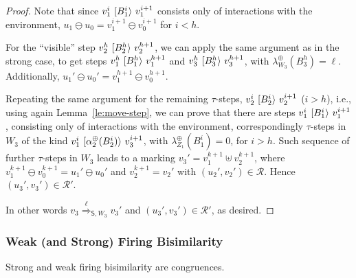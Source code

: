 \documentclass{LMCS}
\newcommand{\mjoin}{\ensuremath{\uplus}}
\newcommand{\monSub}[2]{\ensuremath{{#1}_{#2}^\oplus}}
\newcommand{\trans}[1]{\ensuremath{\ [\/{#1}\/\rangle}\ }
\newcommand{\Ltr}[3][x]{\ensuremath{\stackrel{{#3}}{\Longrightarrow}_{\mathsf{#1},#2}}}
\begin{document}
\begin{proof}
  Note that since $v_1^i \trans{B_1^{i}} v_1^{i+1}$ consists only of
  interactions with the environment, $u_1 \ominus u_0 = v_1^{i+1}
  \ominus v_0^{i+1}$ for $i<h$.

For the ``visible'' step $v_2^h \trans{B_2^h} v_2^{h+1}$, we can apply
the same argument as in the strong case, to get steps $v_1^h
\trans{B_1^{h}} v_1^{h+1}$ and $v_3^h \trans{B_3^{h}} v_3^{h+1}$, with
$\monSub{\lambda}{{W_3}}(B_3^h) = \ell$.  Additionally, $u_1' \ominus u_0' =
v_1^{h+1} \ominus v_0^{h+1}$.

Repeating the same argument for the remaining $\tau$-steps, $v_2^i
\trans{B_2^i} v_2^{i+1}$ ($i > h$), i.e., using again
Lemma~\ref{le:move-step}, we can prove that there are steps $v_1^i
\trans{B_1^{i}} v_1^{i+1}$, consisting only of interactions with the
environment, correspondingly $\tau$-steps in $W_3$ of the kind $v_1^i
\trans{\monSub{\alpha}{2}(B_2^{i})} v_3^{i+1}$, with
$\monSub{\lambda}{{Z_1}}(B_1^i) = 0$, for $i>h$.
Such sequence of further $\tau$-steps in $W_3$ leads to a marking
$v_3' = v_1^{k+1} \mjoin v_2^{k+1}$, where $v_1^{k+1} \ominus
v_0^{k+1} = u_1' \ominus u_0'$ and $v_2^{k+1} = v_2'$ with $(u_2',
v_2') \in \mathcal{R}$. Hence $(u_3', v_3') \in \mathcal{R}'$.

In other words $v_3 \Ltr[S]{W_3}{\ell} v_3'$ and $(u_3', v_3') \in
\mathcal{R}'$, as desired.
\end{proof}


\subsubsection{Weak (and Strong) Firing Bisimilarity}


\begin{thm}
  \label{th:congruence-firing}
  Strong and weak firing bisimilarity are congruences.
\end{thm}
\end{document}
